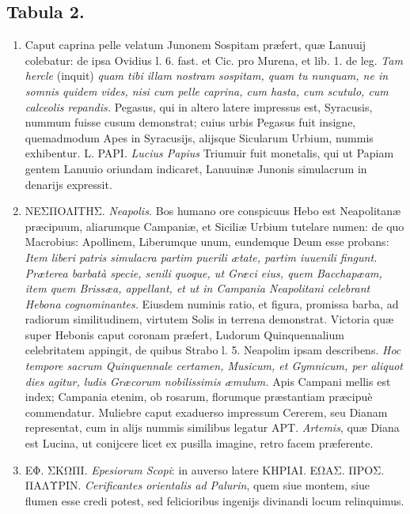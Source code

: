 \documentclass[a4paper, 11pt, oneside, polutonikogreek, latin]{article}
\begin{document}
\subsection*{Tabula 2.}
\begin{enumerate}
    \item Caput caprina pelle velatum Junonem Sospitam præfert, quæ Lanuuij colebatur: de ipsa Ovidius l. 6. fast. et Cic. pro Murena, et lib. 1. de leg. \emph{Tam hercle} (inquit) \emph{quam tibi illam nostram sospitam, quam tu nunquam, ne in somnis quidem vides, nisi cum pelle caprina, cum hasta, cum scutulo, cum calceolis repandis.} Pegasus, qui in altero latere impressus est, Syracusis, nummum fuisse cusum demonstrat; cuius urbis Pegasus fuit insigne, quemadmodum Apes in Syracusijs, alijsque Sicularum Urbium, nummis exhibentur. L. PAPI. \emph{Lucius Papius} Triumuir fuit monetalis, qui ut Papiam gentem Lanuuio oriundam indicaret, Lanuuinæ Junonis simulacrum in denarijs expressit.

    \item \foreignlanguage{greek}{ΝΕΣΠΟΛΙΤΗΣ.} \emph{Neapolis.} Bos humano ore conspicuus Hebo est Neapolitanæ præcipuum, aliarumque Campaniæ, et Siciliæ Urbium tutelare numen: de quo Macrobius: Apollinem, Liberumque unum, eundemque Deum esse probans: \emph{Item liberi patris simulacra partim puerili ætate, partim iuuenili fingunt. Præterea barbatà specie, senili quoque, ut Græci eius, quem Bacchapæam, item quem Brissæa, appellant, et ut in Campania Neapolitani celebrant Hebona cognominantes.} Eiusdem numinis ratio, et figura, promissa barba, ad radiorum similitudinem, virtutem Solis in terrena demonstrat. Victoria quæ super Hebonis caput coronam præfert, Ludorum Quinquennalium celebritatem appingit, de quibus Strabo l. 5. Neapolim ipsam describens. \emph{Hoc tempore sacrum Quinquennale certamen, Musicum, et Gymnicum, per aliquot dies agitur, ludis Græcorum nobilissimis æmulum.} Apis Campani mellis est index; Campania etenim, ob rosarum, florumque præstantiam præcipuè commendatur. Muliebre caput exaduerso impressum Cererem, seu Dianam representat, cum in alijs nummis similibus legatur APT. \emph{Artemis}, quæ Diana est Lucina, ut conijcere licet ex pusilla imagine, retro facem præferente.

    \item \foreignlanguage{greek}{ΕΦ. ΣΚΩΠΙ.} \emph{Epesiorum Scopi}: in auverso latere \foreignlanguage{greek}{ΚΗΡΙΑΙ. ΕΩΑΣ. ΠΡΟΣ. ΠΑΛΥΡΙΝ.} \emph{Cerificantes orientalis ad Palurin}, quem siue montem, siue flumen esse credi potest, sed felicioribus ingenijs divinandi locum relinquimus.


\end{enumerate}
\end{document}
